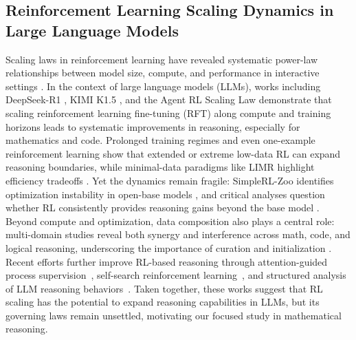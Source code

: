 \subsection{Reinforcement Learning Scaling Dynamics in Large Language Models}
Scaling laws in reinforcement learning have revealed systematic power-law relationships between model size, compute, and performance in interactive settings \citep{hilton2023scaling}. In the context of large language models (LLMs), works including DeepSeek-R1 \citep{guo2025deepseekr1}, KIMI K1.5 \citep{kimi2025scaling}, and the Agent RL Scaling Law \citep{mai2025agent} demonstrate that scaling reinforcement learning fine-tuning (RFT) along compute and training horizons leads to systematic improvements in reasoning, especially for mathematics and code. Prolonged training regimes \citep{liu2025prorl} and even one-example reinforcement learning \citep{wang2025reinforcement} show that extended or extreme low-data RL can expand reasoning boundaries, while minimal-data paradigms like LIMR highlight efficiency tradeoffs \citep{li2025limr}. Yet the dynamics remain fragile: SimpleRL-Zoo identifies optimization instability in open-base models \citep{zeng2025simplerlzoo}, and critical analyses question whether RL consistently provides reasoning gains beyond the base model \citep{yue2025doesrlincentivize}. Beyond compute and optimization, data composition also plays a central role: multi-domain studies reveal both synergy and interference across math, code, and logical reasoning, underscoring the importance of curation and initialization \citep{li2025onedomainhelps, cheng2025revisiting}. Recent efforts further improve RL-based reasoning through attention-guided process supervision~\citep{nie2026attnpo}, self-search reinforcement learning~\citep{fan2025ssrl}, and structured analysis of LLM reasoning behaviors~\citep{yuan2025understandingllmreasoningabstractive}. Taken together, these works suggest that RL scaling has the potential to expand reasoning capabilities in LLMs, but its governing laws remain unsettled, motivating our focused study in mathematical reasoning.


